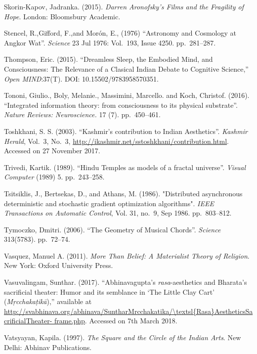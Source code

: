 \begin{thebibliography}{99}
Skorin-Kapov, Jadranka. (2015). \textsl{Darren Aronofsky's Films and the Fragility of Hope}. London: Bloomsbury Academic.


Stencel, R.,Gifford, F.,and Morón, E., (1976) “Astronomy and Cosmology at Angkor Wat”. \textsl{Science} 23 Jul 1976: Vol.~193, Issue 4250. pp.~281--287.

Thompson, Eric. (2015). “Dreamless Sleep, the Embodied Mind, and Consciousness: The Relevance of a Clasical Indian Debate to Cognitive Science,” \textsl{Open MIND}:37(T). DOI: 10.15502/9783958570351.

Tononi, Giulio., Boly, Melanie., Massimini, Marcello. and Koch, Christof. (2016). “Integrated information theory: from consciousness to its physical substrate”. \textsl{Nature Reviews: Neuroscience.} 17 (7). pp.~450--461.

Toshkhani, S. S. (2003). “Kashmir’s contribution to Indian Aesthetics”. \textsl{Kashmir Herald}, Vol.~3, No.~3, \url{http://ikashmir.net/sstoshkhani/contribution.html}. Accessed on 27 November 2017.

Trivedi, Kartik. (1989). “Hindu Temples as models of a fractal universe”. \textsl{Visual Computer} (1989) 5. pp.~243--258.

Tsitsiklis, J., Bertsekas, D., and Athans, M. (1986). "Distributed asynchronous deterministic and stochastic gradient optimization algorithms". \textsl{IEEE Transactions on Automatic Control}, Vol. 31, no.~9, Sep 1986. pp.~803--812.

Tymoczko, Dmitri. (2006). “The Geometry of Musical Chords”. \textsl{Science} 313(5783). pp.~72--74.

Vasquez, Manuel A. (2011). \textsl{More Than Belief: A Materialist Theory of Religion}. New York: Oxford University Press.

Vasuvalingam, Sunthar. (2017). “Abhinavagupta’s \textsl{rasa}-aesthetics and Bharata’s sacrificial theater: Humor and its semblance in ‘The Little Clay Cart’ (\textsl{Mṛcchakaṭikā}),” available at \url{http://svabhinava.org/abhinava/SuntharMrcchakatika/\textsl{Rasa}AestheticsSacrificialTheater- frame.php}. Accessed on 7th March 2018.

Vatsyayan, Kapila. (1997). \textsl{The Square and the Circle of the Indian Arts}. New Delhi: Abhinav Publications.


\end{thebibliography}
